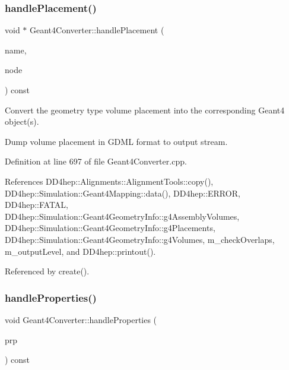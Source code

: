 \subsubsection{\texorpdfstring{handle\+Placement()}{handlePlacement()}}
{\footnotesize\ttfamily void $\ast$ Geant4\+Converter\+::handle\+Placement (\begin{DoxyParamCaption}\item[{const std\+::string \&}]{name,  }\item[{const T\+Geo\+Node $\ast$}]{node }\end{DoxyParamCaption}) const\hspace{0.3cm}{\ttfamily [virtual]}}



Convert the geometry type volume placement into the corresponding Geant4 object(s). 

Dump volume placement in G\+D\+ML format to output stream. 

Definition at line 697 of file Geant4\+Converter.\+cpp.



References D\+D4hep\+::\+Alignments\+::\+Alignment\+Tools\+::copy(), D\+D4hep\+::\+Simulation\+::\+Geant4\+Mapping\+::data(), D\+D4hep\+::\+E\+R\+R\+OR, D\+D4hep\+::\+F\+A\+T\+AL, D\+D4hep\+::\+Simulation\+::\+Geant4\+Geometry\+Info\+::g4\+Assembly\+Volumes, D\+D4hep\+::\+Simulation\+::\+Geant4\+Geometry\+Info\+::g4\+Placements, D\+D4hep\+::\+Simulation\+::\+Geant4\+Geometry\+Info\+::g4\+Volumes, m\+\_\+check\+Overlaps, m\+\_\+output\+Level, and D\+D4hep\+::printout().



Referenced by create().

\hypertarget{class_d_d4hep_1_1_simulation_1_1_geant4_converter_a9a9563d705e1d383c8484a228a613c44}{}\label{class_d_d4hep_1_1_simulation_1_1_geant4_converter_a9a9563d705e1d383c8484a228a613c44} 
\subsubsection{\texorpdfstring{handle\+Properties()}{handleProperties()}}
{\footnotesize\ttfamily void Geant4\+Converter\+::handle\+Properties (\begin{DoxyParamCaption}\item[{\hyperlink{class_d_d4hep_1_1_geometry_1_1_l_c_d_d_a89096744868821bf5dcb0c0560b348c9}{L\+C\+D\+D\+::\+Properties} \&}]{prp }\end{DoxyParamCaption}) const}



